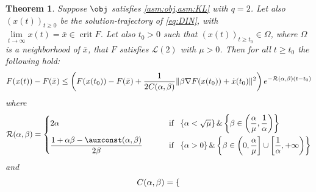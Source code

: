 \documentclass[reqno]{amsart}
\theoremstyle{plain}
\newtheorem{theorem}{Theorem}	%
\theoremstyle{definition}
\theoremstyle{remark}
\DeclareMathOperator{\crit}{crit}	%
\DeclarePairedDelimiter{\norm}{\lVert}{\rVert}	%
\newcommand{\Rb}{\mathcal{R}}
\newcommand{\PM}[1]{}
\begin{document}
\PM{TODO: slight rewrite.}
\begin{theorem}\label{basicteorates}
Suppose $\obj$ satisfies \cref{asm:obj,asm:KL} with $q=2$.
Let also $\left(x(t)\right)_{t\geq 0}$ be the solution-trajectory of \eqref{eq:DIN}, with $\lim\limits_{t\to\infty}x(t)=\bar{x}\in \crit{F}$.
Let also $t_{0}>0$ such that $\left(x(t)\right)_{t\geq t_{0}} \in \Omega$, where $\Omega$ is a neighborhood of $\bar{x}$, that $F$ satisfies \hyperref[PL]{$\mathcal{L}(2)$} with $\mu>0$. Then for all $t\geq t_{0}$ the following hold:
\begin{equation}
	F(x(t))-F(\bar{x}) \leq \left(F(x(t_{0}))-F(\bar{x}) + \frac{1}{2C(\alpha,\beta)}\norm{\beta\nabla F(x(t_{0}))+\dot{x}(t_{0})}^2\right)e^{-\Rb(\alpha,\beta)(t-t_{0})}
\end{equation}
where 
\begin{equation}
\label{rate factor on alphabeta}
\Rb(\alpha,\beta)
    = \begin{dcases}
        2\alpha
            & \text{ if } ~   \left\{\alpha < \sqrt{\mu}\right\}\&  \left\{\beta\in\left(\frac{\alpha}{\mu},\frac{1}{\alpha}\right)\right\}
            \\
        \frac{1+\alpha\beta - \auxconst(\alpha,\beta)}{2\beta}
            \qquad   & \text{ if } ~   \left\{  \alpha > 0\right\} \& \left\{\beta\in \left(0, \frac{\alpha}{\mu}\right]\cup \left[\frac{1}{\alpha},+\infty\right) \right\} 
    \end{dcases}
\end{equation}
and
\begin{equation}
\label{constant on alphabeta}
C(\alpha,\beta) =  \begin{dcases}

\end{dcases}
\end{equation}
\end{theorem}
\end{document}
